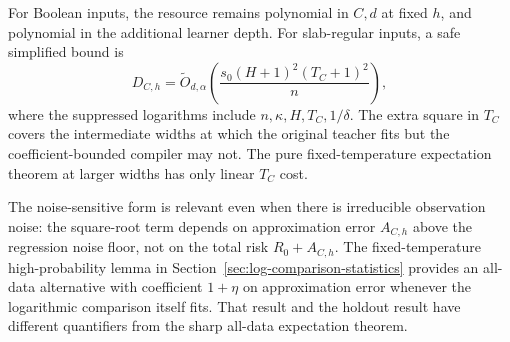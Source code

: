 For Boolean inputs, the resource remains polynomial in $C,d$ at fixed $h$, and polynomial in the additional learner depth. For slab-regular inputs, a safe simplified bound is
\[
 D_{C,h}=\widetilde O_{d,\alpha}\!\left(
 \frac{s_0(H+1)^2(T_C+1)^2}{n}\right),
\]
where the suppressed logarithms include $n,\kappa,H,T_C,1/\delta$. The extra square in $T_C$ covers the intermediate widths at which the original teacher fits but the coefficient-bounded compiler may not. The pure fixed-temperature expectation theorem at larger widths has only linear $T_C$ cost.

The noise-sensitive form is relevant even when there is irreducible observation noise: the square-root term depends on approximation error $A_{C,h}$ above the regression noise floor, not on the total risk $R_0+A_{C,h}$. The fixed-temperature high-probability lemma in Section~\ref{sec:log-comparison-statistics} provides an all-data alternative with coefficient $1+\eta$ on approximation error whenever the logarithmic comparison itself fits. That result and the holdout result have different quantifiers from the sharp all-data expectation theorem.
